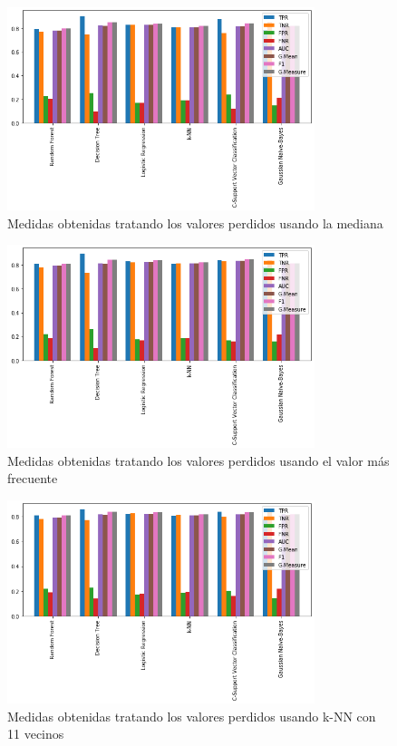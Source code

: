 \begin{figure}[H]
\centering
\includegraphics[width=0.8\textwidth]{imagenes/pre-median.png}
\caption{Medidas obtenidas tratando los valores perdidos usando la mediana}
\end{figure}

\begin{figure}[H]
\centering
\includegraphics[width=0.8\textwidth]{imagenes/pre-most-freq.png}
\caption{Medidas obtenidas tratando los valores perdidos usando el valor más frecuente}
\end{figure}

\begin{figure}[H]
\centering
\includegraphics[width=0.8\textwidth]{imagenes/pre-knn11.png}
\caption{Medidas obtenidas tratando los valores perdidos usando k-NN con 11 vecinos}
\end{figure}

